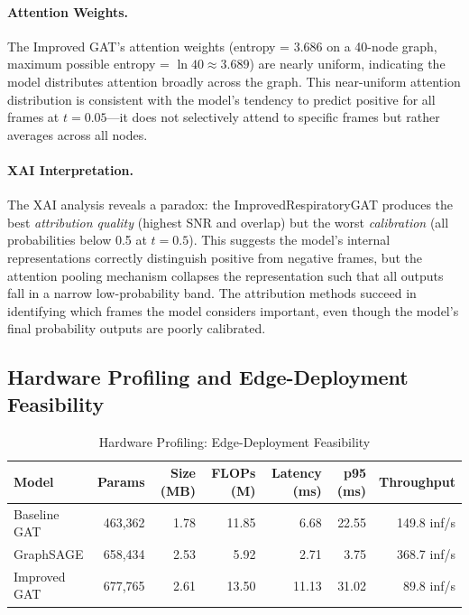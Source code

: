 \paragraph{Attention Weights.}
The Improved GAT's attention weights (entropy = 3.686 on a 40-node
graph, maximum possible entropy = $\ln 40 \approx 3.689$) are nearly
uniform, indicating the model distributes attention broadly across the
graph. This near-uniform attention distribution is consistent with the
model's tendency to predict positive for all frames at $t=0.05$---it
does not selectively attend to specific frames but rather averages
across all nodes.

\paragraph{XAI Interpretation.}
The XAI analysis reveals a paradox: the ImprovedRespiratoryGAT produces
the best \textit{attribution quality} (highest SNR and overlap) but the
worst \textit{calibration} (all probabilities below 0.5 at $t=0.5$).
This suggests the model's internal representations correctly distinguish
positive from negative frames, but the attention pooling mechanism
collapses the representation such that all outputs fall in a narrow
low-probability band. The attribution methods succeed in identifying
which frames the model considers important, even though the model's
final probability outputs are poorly calibrated.

\subsection{Hardware Profiling and Edge-Deployment Feasibility}

\begin{table}[!h]
  \renewcommand{\arraystretch}{1.15}
  \caption{Hardware Profiling: Edge-Deployment Feasibility}
  \label{tab:hardware}
  \centering
  \begin{tabular}{@{}lrrrrrr@{}}
    \toprule
    \textbf{Model}
      & \textbf{Params}
      & \textbf{Size (MB)}
      & \textbf{FLOPs (M)}
      & \textbf{Latency (ms)}
      & \textbf{p95 (ms)}
      & \textbf{Throughput} \\
    \midrule
    Baseline GAT   & 463,362 & 1.78 & 11.85 & 6.68  & 22.55 & 149.8 inf/s \\
    GraphSAGE      & 658,434 & 2.53 &  5.92 & 2.71  &  3.75 & 368.7 inf/s \\
    Improved GAT   & 677,765 & 2.61 & 13.50 & 11.13 & 31.02 &  89.8 inf/s \\
    \bottomrule
  \end{tabular}
\end{table}

